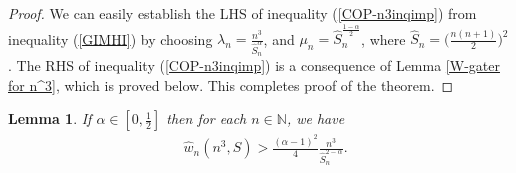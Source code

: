 \documentclass[12pt]{amsart}
\newtheorem{Lemma}[Theorem]{\sc Lemma}
\theoremstyle{definition}
\theoremstyle{plain}
\theoremstyle{definition}
\numberwithin{equation}{section}
\begin{document}
\begin{proof}
We can easily establish the LHS of inequality (\ref{COP-n3inqimp}) from inequality (\ref{GIMHI}) by choosing $\lambda_{n}=\frac{n^3}{\hat{S}_{n}^{\alpha}}$, and  $\mu_{n}=\hat{S}_{n}^{\frac{1-\alpha}{2}}$, where $\hat{S}_{n}=\big(\frac{n(n+1)}{2}\big)^{2}$. The RHS of inequality (\ref{COP-n3inqimp}) is a consequence of Lemma \ref{W-gater for n^3}, which is proved below. This completes proof of the theorem.
\end{proof}
\begin{Lemma}{\label{W-gater for n^3}}
If $\alpha\in[0,\frac{1}{2}]$ then for each $n\in\mathbb{N}$, we have
\begin{align*}
&\hat{w}_{n}(n^3, S)>\frac{(\alpha-1)^{2}}{4}\frac{n^{3}}{\hat{S}_{n}^{2-\alpha}}.
\end{align*}
\end{Lemma}
\end{document}
